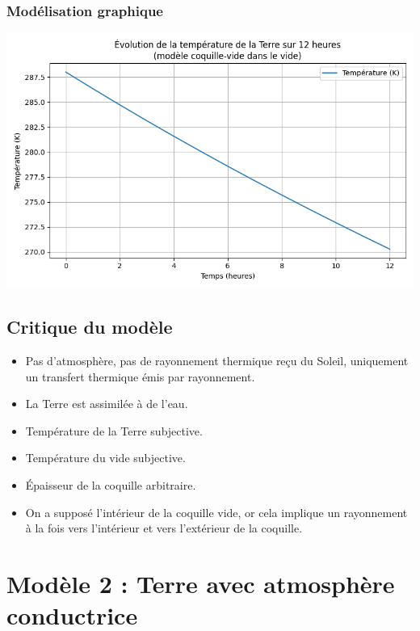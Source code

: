 \documentclass[a4paper,12pt]{article}
\begin{document}
\subsubsection*{Modélisation graphique}   
\begin{center}
  \includegraphics[width=0.8\linewidth]{../modele1/figures/modele1_coquille.png} 
\end{center}



\subsection{Critique du modèle}

\begin{itemize}
    \item Pas d’atmosphère, pas de rayonnement thermique reçu du Soleil, uniquement un transfert thermique émis par rayonnement.
    \item La Terre est assimilée à de l’eau.
    \item Température de la Terre subjective.
    \item Température du vide subjective.
    \item Épaisseur de la coquille arbitraire.
    \item On a supposé l'intérieur de la coquille vide, or cela implique un rayonnement à la fois vers l'intérieur et vers l'extérieur de la coquille.
\end{itemize}  

\newpage
\section{Modèle 2 : Terre avec atmosphère conductrice}
\label{sec:modèle 2}
\end{document}
